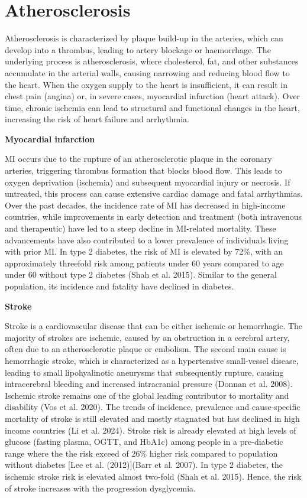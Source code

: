 \documentclass[
  a4paper,
  headsepline=true,
  open=any]{scrbook}
\begin{document}

\hypertarget{atherosclerosis}{%
\chapter{Atherosclerosis}\label{atherosclerosis}}

Atherosclerosis is characterized by plaque build-up in the arteries,
which can develop into a thrombus, leading to artery blockage or
haemorrhage. The underlying process is atherosclerosis, where
cholesterol, fat, and other substances accumulate in the arterial walls,
causing narrowing and reducing blood flow to the heart. When the oxygen
supply to the heart is insufficient, it can result in chest pain
(angina) or, in severe cases, myocardial infarction (heart attack). Over
time, chronic ischemia can lead to structural and functional changes in
the heart, increasing the risk of heart failure and arrhythmia.

\textbf{Myocardial infarction}

MI occurs due to the rupture of an atherosclerotic plaque in the
coronary arteries, triggering thrombus formation that blocks blood flow.
This leads to oxygen deprivation (ischemia) and subsequent myocardial
injury or necrosis. If untreated, this process can cause extensive
cardiac damage and fatal arrhythmias. Over the past decades, the
incidence rate of MI has decreased in high-income countries, while
improvements in early detection and treatment (both intravenous and
therapeutic) have led to a steep decline in MI-related mortality. These
advancements have also contributed to a lower prevalence of individuals
living with prior MI. In type 2 diabetes, the risk of MI is elevated by
72\%, with an approximately threefold risk among patients under 60 years
compared to age under 60 without type 2 diabetes (Shah et al. 2015).
Similar to the general population, its incidence and fatality have
declined in diabetes.

\textbf{Stroke}

Stroke is a cardiovascular disease that can be either ischemic or
hemorrhagic. The majority of strokes are ischemic, caused by an
obstruction in a cerebral artery, often due to an atherosclerotic plaque
or embolism. The second main cause is hemorrhagic stroke, which is
characterized as a hypertensive small-vessel disease, leading to small
lipohyalinotic aneurysms that subsequently rupture, causing
intracerebral bleeding and increased intracranial pressure (Donnan et
al. 2008). Ischemic stroke remains one of the global leading contributor
to mortality and disability (Vos et al. 2020). The trends of incidence,
prevalence and cause-specific mortality of stroke is still elevated and
mostly stagnated but has declined in high income countries (Li et al.
2024). Stroke risk is already elevated at high levels of glucose
(fasting plasma, OGTT, and HbA1c) among people in a pre-diabetic range
where the the risk exceed of 26\% higher risk compared to population
without diabetes {[}Lee et al. (2012){]}(Barr et al. 2007). In type 2
diabetes, the ischemic stroke risk is elevated almost two-fold (Shah et
al. 2015). Hence, the risk of stroke increases with the progression
dysglycemia.
\end{document}
